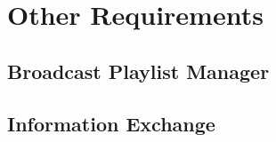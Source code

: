 \KNEADSECTIONNEWPAGE
\section{Other Requirements}
\label{lab:sec_OtherRequirements}


\subsection{Broadcast Playlist Manager}
\label{loc:ssec_Playlist}


\subsection{Information Exchange}
\label{loc:ssec_InfoExchange}
